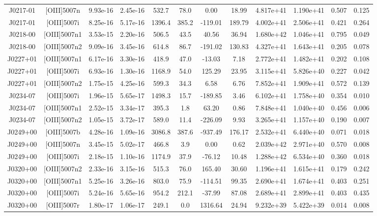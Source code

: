 \begin{table}
\begin{tabular}{cccccccccccc}
J0217-01 & [OIII]5007n & 9.93e-16 & 2.45e-16 & 532.7 & 78.0 & 0.00 & 18.99 & 4.817e+41 & 1.190e+41 & 0.507 & 0.125 \\
J0217-01 & [OIII]5007i & 8.25e-16 & 5.17e-16 & 1396.4 & 385.2 & -119.01 & 189.79 & 4.002e+41 & 2.506e+41 & 0.421 & 0.264 \\
J0218-00 & [OIII]5007n1 & 3.53e-15 & 2.20e-16 & 506.5 & 43.5 & 40.56 & 36.94 & 1.680e+42 & 1.046e+41 & 0.795 & 0.049 \\
J0218-00 & [OIII]5007n2 & 9.09e-16 & 3.45e-16 & 614.8 & 86.7 & -191.02 & 130.83 & 4.327e+41 & 1.643e+41 & 0.205 & 0.078 \\
J0227+01 & [OIII]5007n1 & 6.17e-16 & 3.30e-16 & 418.9 & 47.0 & -13.03 & 7.18 & 2.772e+41 & 1.482e+41 & 0.202 & 0.108 \\
J0227+01 & [OIII]5007i & 6.93e-16 & 1.30e-16 & 1168.9 & 54.0 & 125.29 & 23.95 & 3.115e+41 & 5.826e+40 & 0.227 & 0.042 \\
J0227+01 & [OIII]5007n2 & 1.75e-15 & 4.25e-16 & 599.3 & 34.3 & 6.58 & 6.76 & 7.852e+41 & 1.909e+41 & 0.572 & 0.139 \\
J0234-07 & [OIII]5007i & 1.96e-15 & 5.65e-17 & 1498.3 & 15.7 & -189.85 & 3.46 & 6.102e+41 & 1.758e+40 & 0.354 & 0.010 \\
J0234-07 & [OIII]5007n1 & 2.52e-15 & 3.34e-17 & 395.3 & 1.8 & 63.20 & 0.86 & 7.848e+41 & 1.040e+40 & 0.456 & 0.006 \\
J0234-07 & [OIII]5007n2 & 1.05e-15 & 3.72e-17 & 589.0 & 11.4 & -226.09 & 9.93 & 3.265e+41 & 1.157e+40 & 0.190 & 0.007 \\
J0249+00 & [OIII]5007b & 4.28e-16 & 1.09e-16 & 3086.8 & 387.6 & -937.49 & 176.17 & 2.532e+41 & 6.440e+40 & 0.071 & 0.018 \\
J0249+00 & [OIII]5007n & 3.45e-15 & 5.02e-17 & 466.8 & 3.9 & 0.00 & 0.62 & 2.039e+42 & 2.971e+40 & 0.570 & 0.008 \\
J0249+00 & [OIII]5007i & 2.18e-15 & 1.10e-16 & 1174.9 & 37.9 & -76.12 & 10.48 & 1.288e+42 & 6.534e+40 & 0.360 & 0.018 \\
J0320+00 & [OIII]5007n2 & 2.33e-16 & 3.15e-16 & 515.3 & 76.0 & 165.40 & 30.60 & 1.196e+41 & 1.615e+41 & 0.179 & 0.242 \\
J0320+00 & [OIII]5007n1 & 5.25e-16 & 3.26e-16 & 803.0 & 75.9 & -114.51 & 99.35 & 2.690e+41 & 1.674e+41 & 0.403 & 0.251 \\
J0320+00 & [OIII]5007i & 5.24e-16 & 5.65e-16 & 954.2 & 212.1 & -37.99 & 87.08 & 2.689e+41 & 2.899e+41 & 0.403 & 0.435 \\
J0320+00 & [OIII]5007r & 1.80e-17 & 1.06e-17 & 249.1 & 0.0 & 1316.64 & 24.94 & 9.232e+39 & 5.422e+39 & 0.014 & 0.008 \\

\end{tabular}
\end{table}
